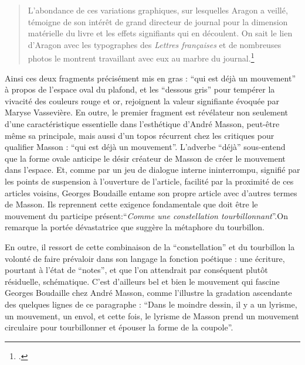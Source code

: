 \begin{quote}
L’abondance de ces variations graphiques, sur lesquelles Aragon a veillé, témoigne de son intérêt de grand directeur de journal pour la dimension matérielle du livre et les effets signifiants qui en découlent. On sait le lien d’Aragon avec les typographes des \emph{Lettres françaises }et de nombreuses photos le montrent travaillant avec eux au marbre du journal.\footcite[p333]{vasseviere}	
\end{quote}

Ainsi ces deux fragments précisément mis en gras : \enquote{qui est déjà un mouvement} à propos de l’espace oval du plafond, et  les \enquote{dessous gris} pour tempérer la vivacité des couleurs rouge et or, rejoignent la valeur signifiante évoquée par Maryse Vassevière. En outre, le premier fragment est révélateur non seulement d’une caractéristique essentielle dans l’esthétique d’André Masson, peut-être même sa principale, mais aussi d’un topos récurrent chez les critiques pour qualifier Masson : \enquote{qui est déjà un mouvement}. L’adverbe \enquote{déjà} sous-entend que la forme ovale anticipe le désir créateur de Masson de créer le mouvement dans l’espace. Et, comme par un jeu de dialogue interne ininterrompu, signifié par les points de suspension à l’ouverture de l’article, facilité par la proximité de ces articles voisins, Georges Boudaille entame son propre article avec d’autres termes de Masson. Ils reprennent cette exigence fondamentale que doit être le mouvement du participe présent:\enquote{\emph{Comme une constellation tourbillonnant}}.On remarque la portée dévastatrice que suggère la métaphore du tourbillon. 




	En outre, il  ressort de cette combinaison de la \enquote{constellation} et du tourbillon la volonté de faire prévaloir dans son langage la fonction poétique : une écriture, pourtant à l’état de \enquote{notes}, et que l’on attendrait par conséquent plutôt résiduelle, schématique. C’est d’ailleurs bel et bien le mouvement qui fascine Georges Boudaille chez André Masson, comme l’illustre la gradation ascendante des quelques lignes de ce paragraphe : \enquote{Dans le moindre dessin, il y a un lyrisme, un mouvement, un envol, et cette fois, le lyrisme de Masson prend un mouvement circulaire pour tourbillonner et épouser la forme de la coupole}. 

